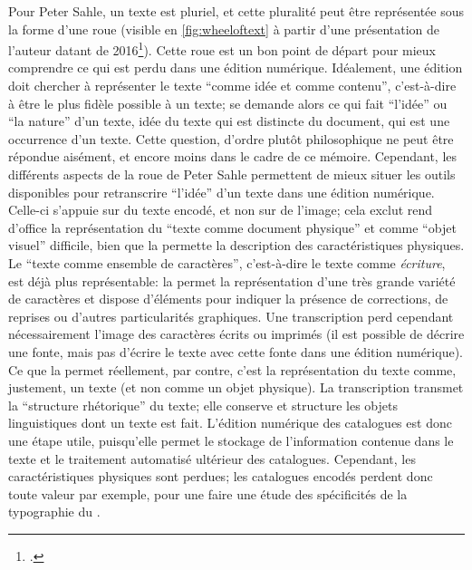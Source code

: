 Pour Peter Sahle, un texte est pluriel, et cette pluralité peut être représentée sous la forme d'une roue (visible en \ref{fig:wheeloftext} à partir d'une présentation de l'auteur datant de 2016\footcite[p. 21]{sahle_what_2016}). Cette roue est un bon point de départ pour mieux comprendre ce qui est perdu dans une édition numérique. Idéalement, une édition \tei{} doit chercher à représenter le texte \enquote{comme idée et comme contenu}, c'est-à-dire à être le plus fidèle possible à un texte; se demande alors ce qui fait \enquote{l'idée} ou \enquote{la nature} d'un texte, idée du texte qui est distincte du document, qui est une occurrence d'un texte. Cette question, d'ordre plutôt philosophique ne peut être répondue aisément, et encore moins dans le cadre de ce mémoire. Cependant, les différents aspects de la roue de Peter Sahle permettent de mieux situer les outils disponibles pour retranscrire \enquote{l'idée} d'un texte dans une édition numérique. Celle-ci s'appuie sur du texte encodé, et non sur de l'image; cela exclut rend d'office la représentation du \enquote{texte comme document physique} et comme \enquote{objet visuel} difficile, bien que la \tei{} permette la description des caractéristiques physiques. Le \enquote{texte comme ensemble de caractères}, c'est-à-dire le texte comme \textit{écriture}, est déjà plus représentable: la \tei{} permet la représentation d'une très grande variété de caractères et dispose d'éléments pour indiquer la présence de corrections, de reprises ou d'autres particularités graphiques. Une transcription perd cependant nécessairement l'image des caractères écrits ou imprimés (il est possible de décrire une fonte, mais pas d'écrire le texte avec cette fonte dans une édition numérique). Ce que la \tei{} permet réellement, par contre, c'est la représentation du texte comme, justement, un texte (et non comme un objet physique). La transcription transmet la \enquote{structure rhétorique} du texte; elle conserve et structure les objets linguistiques dont un texte est fait. L'édition numérique des catalogues est donc une étape utile, puisqu'elle permet le stockage de l'information contenue dans le texte et le traitement automatisé ultérieur des catalogues. Cependant, les caractéristiques physiques sont perdues; les catalogues encodés perdent donc toute valeur par exemple, pour une faire une étude des spécificités de la typographie du .


